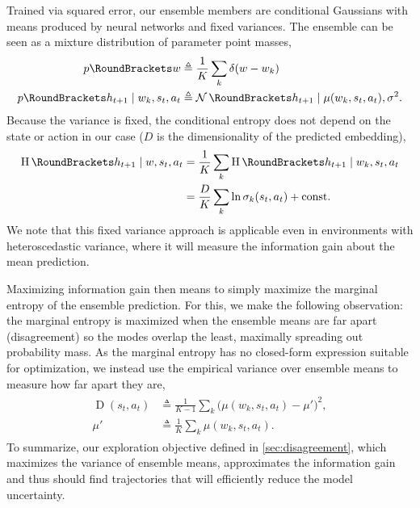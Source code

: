 \documentclass{article}
\begin{document}
Trained via squared error, our ensemble members are conditional Gaussians with means produced by neural networks and fixed variances. The ensemble can be seen as a mixture distribution of parameter point masses,
\begin{gather}
\begin{aligned}
\p(w) &\triangleq \frac{1}{K} \sum_k \delta(w-w_k) \\
\p(h_{t+1}|w_k,s_t,a_t) &\triangleq \Normal(h_{t+1}|\mu(w_k,s_t,a_t),\sigma^2).
\end{aligned}\raisetag{7ex}
\end{gather}
Because the variance is fixed, the conditional entropy does not depend on the state or action in our case ($D$ is the dimensionality of the predicted embedding),
\begin{gather}
\begin{aligned}
\H(h_{t+1}|w,s_t,a_t)
&=\frac{1}{K}\sum_k \H(h_{t+1}|w_k,s_t,a_t) \\
&=\frac{D}{K}\sum_k \ln\sigma_k(s_t,a_t) + \text{const}.
\end{aligned}
\end{gather}%
We note that this fixed variance approach is applicable even in environments with heteroscedastic variance, where it will measure the information gain about the mean prediction.

Maximizing information gain then means to simply maximize the marginal entropy of the ensemble prediction. For this, we make the following observation: the marginal entropy is maximized when the ensemble means are far apart (disagreement) so the modes overlap the least, maximally spreading out probability mass.
As the marginal entropy has no closed-form expression suitable for optimization, we instead use the empirical variance over ensemble means to measure how far apart they are,
\begin{gather}
\begin{aligned}
\operatorname{D}(s_t,a_t) &\triangleq \frac{1}{K-1}\sum_k\big( \mu(w_k,s_t,a_t)-\mu'\big)^2, \\
\mu' &\triangleq \frac{1}{K}\sum_k\mu(w_k,s_t,a_t).
\end{aligned}
\end{gather}%
To summarize, our exploration objective defined in \cref{sec:disagreement}, which maximizes the variance of ensemble means, approximates the information gain and thus should find trajectories that will efficiently reduce the model uncertainty.

%
\end{document}
